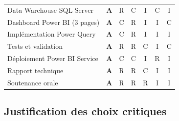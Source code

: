 \documentclass[12pt, a4paper]{report}
\begin{document}
\begin{longtable}{>{\raggedright\arraybackslash}p{5cm} cccccc}
\rowcolor{white}
Data Warehouse SQL Server & 
\cellcolor{green!20}\textbf{A} & 
\cellcolor{orange!20}R & 
\cellcolor{blue!10}C & 
\cellcolor{gray!10}I & 
\cellcolor{blue!10}C & 
\cellcolor{gray!10}I \\

\rowcolor{gray!8}
Dashboard Power BI (3 pages) & 
\cellcolor{green!20}\textbf{A} & 
\cellcolor{blue!10}C & 
\cellcolor{orange!20}R & 
\cellcolor{gray!10}I & 
\cellcolor{gray!10}I & 
\cellcolor{blue!10}C \\

\rowcolor{white}
Implémentation Power Query & 
\cellcolor{green!20}\textbf{A} & 
\cellcolor{blue!10}C & 
\cellcolor{orange!20}R & 
\cellcolor{gray!10}I & 
\cellcolor{gray!10}I & 
\cellcolor{gray!10}I \\

\rowcolor{gray!8}
Tests et validation & 
\cellcolor{green!20}\textbf{A} & 
\cellcolor{orange!20}R & 
\cellcolor{orange!20}R & 
\cellcolor{blue!10}C & 
\cellcolor{gray!10}I & 
\cellcolor{blue!10}C \\

\rowcolor{white}
Déploiement Power BI Service & 
\cellcolor{green!20}\textbf{A} & 
\cellcolor{blue!10}C & 
\cellcolor{blue!10}C & 
\cellcolor{gray!10}I & 
\cellcolor{orange!20}R & 
\cellcolor{gray!10}I \\

\rowcolor{gray!8}
Rapport technique & 
\cellcolor{green!20}\textbf{A} & 
\cellcolor{orange!20}R & 
\cellcolor{orange!20}R & 
\cellcolor{blue!10}C & 
\cellcolor{gray!10}I & 
\cellcolor{gray!10}I \\

\rowcolor{white}
Soutenance orale & 
\cellcolor{green!20}\textbf{A} & 
\cellcolor{orange!20}R & 
\cellcolor{orange!20}R & 
\cellcolor{orange!20}R & 
\cellcolor{gray!10}I & 
\cellcolor{gray!10}I \\

\end{longtable}

\subsection{Justification des choix critiques}
\end{document}
